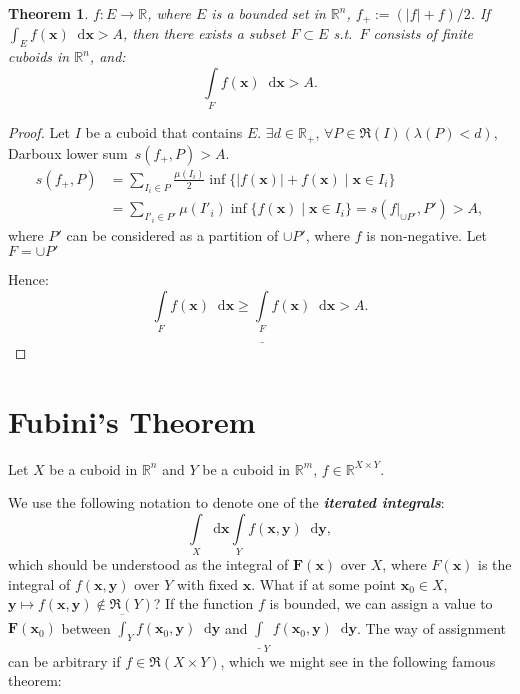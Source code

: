 \documentclass[openany]{book}
\theoremstyle{plain}
\newtheorem{theorem}{Theorem}[section] %
\theoremstyle{definition}
\newcommand{\dif}{\mathop{}\!\mathrm{d}} %
\newcommand*{\bv}{\boldsymbol} %
\newcommand{\emphbf}[1]{\emph{\textbf{#1}}}
\begin{document}
\begin{theorem}
	\label{theorem: positive part of the integral}
	$f \colon E \to \mathbb R$, where $E$ is a bounded set in $\mathbb R^n$, $f_+ := (|f| + f)/2$. 
	If $\int_E f(\bv x) \dif \bv x > A$, then there exists a subset $F \subset E$ s.t.\ $F$ consists of finite cuboids in $\mathbb R^n$, and:
	\begin{equation*}
		\int\limits_F f(\bv x) \dif \bv x > A.
	\end{equation*}
\end{theorem}
\begin{proof}
	Let $I$ be a cuboid that contains $E$.
	$\exists d \in \mathbb R_+$, $\forall P \in \mathfrak R(I) (\lambda(P) < d)$, Darboux lower sum~$s(f_+, P) > A$. 
	\begin{align*}
		s(f_+, P) &= \sum_{I_i \in P} \frac{\mu(I_i)}{2} \inf\{|f(\bv x)| + f(\bv x) \mid \bv x \in I_i\} 
		\\
		&= \sum_{I'_i \in P'} \mu(I'_i) \inf\{f(\bv x) \mid \bv x \in I_i\}
		= s(f|_{\cup P'}, P') > A,
	\end{align*}
	where $P'$ can be considered as a partition of $\cup P'$, where $f$ is non-negative.
	Let $F = \cup P'$

	Hence:
	\begin{equation*}
		\int\limits_F f(\bv x) \dif \bv x \geq \underline{\int\limits_F} f(\bv x) \dif \bv x > A.
	\end{equation*}
\end{proof}

\section{Fubini's Theorem}

Let $X$ be a cuboid in $\mathbb R^n$ and $Y$ be a cuboid in $\mathbb R^m$, $f \in \mathbb R^{X \times Y}$. 

We use the following notation to denote one of the \emphbf{iterated integrals}:
\begin{equation*}
	\int\limits_X \dif \bv x \int\limits_Y  f(\bv x, \bv y)  \dif \bv y, 
\end{equation*}
which should be understood as the integral of $\bv F(\bv x)$ over $X$, where $F(\bv x)$ is the integral of $f(\bv x, \bv y)$ over $Y$ with fixed $\bv x$. 
What if at some point $\bv x_0 \in X$, $\bv y \mapsto f(\bv x, \bv y) \notin \mathfrak R(Y)$? 
If the function $f$ is bounded, we can assign a value to $\bv F(\bv x_0)$ between $\overline{\int}_Y f(\bv x_0, \bv y) \dif \bv y$ and $\underline{\int}_Y f(\bv x_0, \bv y) \dif \bv y$. 
The way of assignment can be arbitrary if $f \in \mathfrak R(X \times Y)$, which we might see in the following famous theorem:
\end{document}
